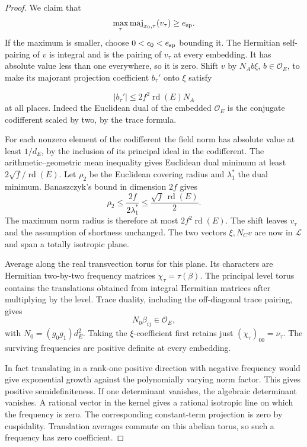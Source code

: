 \begin{proof}
We claim that
\[
 \max_\tau\operatorname{maj}_{x_0,\tau}(v_\tau)\ge e_{\rm sp}.
\]
If the maximum is smaller, choose \(0<\epsilon_0<e_{\rm sp}\)
bounding it. The Hermitian self-pairing of \(v\) is integral
and is the pairing of \(v_\tau\) at every embedding. It has
absolute value less than one everywhere, so it is zero.
Shift \(v\) by \(N_A b\xi\), \(b\in\mathcal O_E\), to make its
majorant projection coefficient \(b_\tau'\) onto \(\xi\) satisfy

\[
  |b_\tau'|\le 2f^2\operatorname{rd}(E)N_A
\]
 at all places.
Indeed the Euclidean dual of the embedded \(\mathcal O_E\)
is the conjugate codifferent scaled by two, by the trace formula.

For each nonzero element of the codifferent the field norm has
absolute value at least \(1/d_E\), by the inclusion of its
principal ideal in the codifferent. The arithmetic--geometric
mean inequality gives Euclidean dual minimum at least
\(2\sqrt f/\operatorname{rd}(E)\).
Let \(\rho_2\) be the Euclidean covering radius and \(\lambda_1^*\) the dual minimum. Banaszczyk's bound in dimension \(2f\) gives
\[
  \rho_2\le\frac{2f}{2\lambda_1^*}\le\frac{\sqrt f\,\operatorname{rd}(E)}2.
\]
The maximum norm radius is therefore at most
\(2f^2\operatorname{rd}(E)\). \cite{banaszczyk}
The shift leaves \(v_\tau\) and the assumption of shortness
unchanged. The two vectors \(\xi,N_Cv\) are now in \(\mathcal L\)
and span a totally isotropic plane.

Average along the real transvection torus for this plane. Its
characters are Hermitian two-by-two frequency matrices
\(\chi_\tau=\tau(\beta)\). The principal level torus contains the
translations obtained from integral Hermitian matrices after
multiplying by the level. Trace duality, including the off-diagonal
trace pairing, gives 
\[
  N_0\beta_{ij}\in\mathcal O_E,
\]
 with
\(N_0=(g_0g_1)d_E^2\). Taking the \(\xi\)-coefficient first retains
just \((\chi_\tau)_{00}=\nu_\tau\). The surviving frequencies are
positive definite at every embedding.

In fact translating in a
rank-one positive direction with negative frequency would give
exponential growth against the polynomially varying norm factor.
This gives positive semidefiniteness. If one determinant vanishes,
the algebraic determinant vanishes. A rational vector in the
kernel gives a rational isotropic line on which the frequency
is zero. The corresponding constant-term projection is zero by
cuspidality. Translation averages commute on this abelian torus,
so such a frequency has zero coefficient.


\end{proof}
